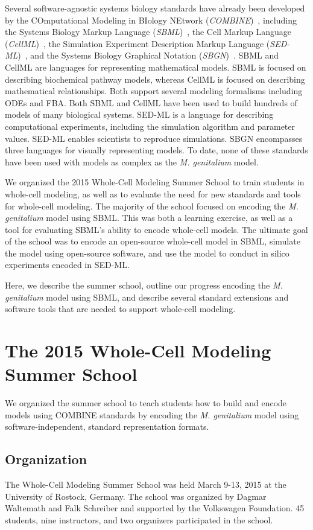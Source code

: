 \documentclass[journal,transmag]{IEEEtran}
\begin{document}
Several software-agnostic systems biology standards have already been developed by the COmputational Modeling in BIology NEtwork (\emph{COMBINE})~\cite{le2011meeting}, including the Systems Biology Markup Language (\emph{SBML})~\cite{hucka2003}, the Cell Markup Language (\emph{CellML})~\cite{hedley_2001b}, the Simulation Experiment Description Markup Language (\emph{SED-ML})~\cite{sedml2011}, and the Systems Biology Graphical Notation (\emph{SBGN})~\cite{LeNovereHMMSS09}. SBML and CellML are languages for representing mathematical models. SBML is focused on describing biochemical pathway models, whereas CellML is focused on describing mathematical relationships. Both support several modeling formalisms including ODEs and FBA. Both SBML and CellML have been used to build hundreds of models of many biological systems. SED-ML is a language for describing computational experiments, including the simulation algorithm and parameter values. SED-ML enables scientists to reproduce simulations. SBGN encompasses three languages for  visually representing models. To date, none of these standards have been used with models as complex as the \textit{M. genitalium} model.

We organized the 2015 Whole-Cell Modeling Summer School to train students in whole-cell modeling, as well as to evaluate the need for new standards and tools for whole-cell modeling. The majority of the school focused on encoding the \textit{M. genitalium} model using SBML. This was both a learning exercise, as well as a tool for evaluating SBML's ability to encode whole-cell models. The ultimate goal of the school was to encode an open-source whole-cell model in SBML, simulate the model using open-source software, and use the model to conduct in silico experiments encoded in SED-ML.

Here, we describe the summer school, outline our progress encoding the \textit{M. genitalium} model using SBML, and describe several standard extensions and software tools that are needed to support whole-cell modeling.

\section{The 2015 Whole-Cell Modeling Summer School}
We organized the summer school to teach students how to build and encode models using COMBINE standards by encoding the \textit{M. genitalium} model using software-independent, standard representation formats.

\subsection{Organization}
The Whole-Cell Modeling Summer School was held March 9-13, 2015 at the University of Rostock, Germany. The school was organized by Dagmar Waltemath and Falk Schreiber and supported by the Volkswagen Foundation. 45 students, nine instructors, and two organizers participated in the school.
\end{document}
